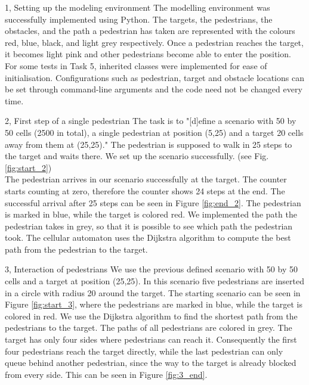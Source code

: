 \documentclass[10pt,a4paper]{article}
\begin{document}
\frontpage

\begin{task}{1, Setting up the modeling environment}
The modelling environment was successfully implemented using Python. The targets, the pedestrians, the obstacles, and the path a pedestrian has taken are represented with the colours red, blue, black, and light grey respectively. Once a pedestrian reaches the target, it becomes light pink and other pedestrians become able to enter the position. For some tests in Task 5, inherited classes were implemented for ease of initialisation. Configurations such as pedestrian, target and obstacle locations can be set through command-line arguments and the code need not be changed every time.
\end{task}
\begin{task}{2, First step of a single pedestrian}
The task is to "[d]efine a scenario with 50 by 50 cells (2500 in total), a single pedestrian at position (5,25) and a target 20 cells away from them at (25,25)." The pedestrian is supposed to walk in 25 steps to the target and waits there. We set up the scenario successfully. (see Fig. \ref{fig:start_2})\\
The pedestrian arrives in our scenario successfully at the target. The counter starts counting at zero, therefore the counter shows 24 steps at the end. The successful arrival after 25 steps can be seen in Figure \ref{fig:end_2}. The pedestrian is marked in blue, while the target is colored red. We implemented the path the pedestrian takes in grey, so that it is possible to see which path the pedestrian took. The cellular automaton uses the Dijkstra algorithm to compute the best path from the pedestrian to the target.
\end{task}
\begin{task}{3, Interaction of pedestrians}
We use the previous defined scenario with 50 by 50 cells and a target at position (25,25). In this scenario five pedestrians are inserted in a circle with radius 20 around the target. The starting scenario can be seen in Figure \ref{fig:start_3}, where the pedestrians are marked in blue, while the target is colored in red.
We use the Dijkstra algorithm to find the shortest path from the pedestrians to the target. The paths of all pedestrians are colored in grey. The target has only four sides where pedestrians can reach it. Consequently the first four pedestrians reach the target directly, while the last pedestrian can only queue behind another pedestrian, since the way to the target is already blocked from every side. This can be seen in Figure \ref{fig:3_end}.
\end{task}
\end{document}
